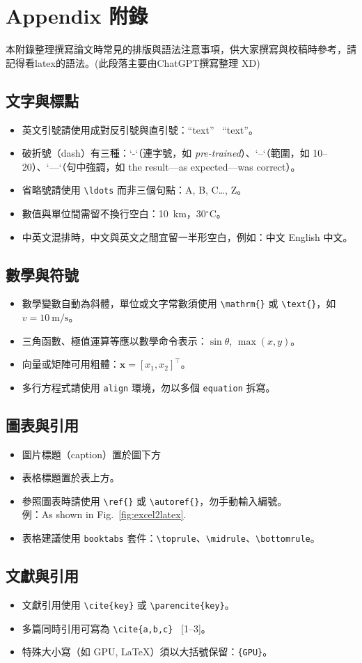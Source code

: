 \chapter{Appendix 附錄}
\label{ch:appendix}

本附錄整理撰寫論文時常見的排版與語法注意事項，供大家撰寫與校稿時參考，請記得看latex的語法。(此段落主要由ChatGPT撰寫整理 XD)

\section*{文字與標點}
\begin{itemize}
  \item 英文引號請使用成對反引號與直引號：``text'' \textrightarrow\ “text”。
  \item 破折號（dash）有三種：`-`（連字號，如 \textit{pre-trained}）、`--`（範圍，如 10--20）、`---`（句中強調，如 the result---as expected---was correct）。
  \item 省略號請使用 \verb|\ldots| 而非三個句點：A, B, C\ldots, Z。
  \item 數值與單位間需留不換行空白：10~km，30$^\circ$C。
  \item 中英文混排時，中文與英文之間宜留一半形空白，例如：中文 English 中文。
\end{itemize}

\section*{數學與符號}
\begin{itemize}
  \item 數學變數自動為斜體，單位或文字常數須使用 \verb|\mathrm{}| 或 \verb|\text{}|，如 $v=10~\mathrm{m/s}$。
  \item 三角函數、極值運算等應以數學命令表示：$\sin\theta$, $\max(x,y)$。
  \item 向量或矩陣可用粗體：$\mathbf{x}=[x_1,x_2]^\top$。
  \item 多行方程式請使用 \texttt{align} 環境，勿以多個 \texttt{equation} 拆寫。
\end{itemize}


\section*{圖表與引用}
\begin{itemize}
  \item 圖片標題（caption）置於圖下方
  \item 表格標題置於表上方。
  \item 參照圖表時請使用 \verb|\ref{}| 或 \verb|\autoref{}|，勿手動輸入編號。\\
        例：As shown in Fig.~\ref{fig:excel2latex}.
  \item 表格建議使用 \texttt{booktabs} 套件：\verb|\toprule|、\verb|\midrule|、\verb|\bottomrule|。
\end{itemize}

\section*{文獻與引用}
\begin{itemize}
  \item 文獻引用使用 \verb|\cite{key}| 或 \verb|\parencite{key}|。
  \item 多篇同時引用可寫為 \verb|\cite{a,b,c}| \textrightarrow\ [1–3]。
  \item 特殊大小寫（如 GPU, LaTeX）須以大括號保留：\verb|{GPU}|。
\end{itemize}
